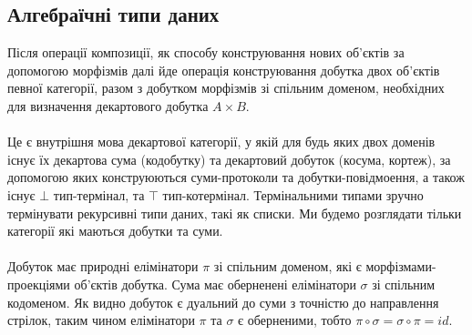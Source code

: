 \documentclass[11pt,oneside]{article}
\begin{document}
\newpage
\subsection{Алгебраїчні типи даних}

    Після операції композиції, як способу конструювання нових об’єктів
    за допомогою морфізмів далі йде операція конструювання добутка двох об’єктів певної категорії,
    разом з добутком морфізмів зі спільним доменом, необхідних для визначення декартового добутка $A \times B$.

    \paragraph{}
    Це є внутрішня мова декартової категорії, у якій для будь яких двох доменів існує їх декартова сума (кодобутку)
    та декартовий добуток (косума, кортеж), за допомогою яких конструюються суми-протоколи та добутки-повідмоення,
    а також існує $\bot$ тип-термінал, та $\top$ тип-котермінал. Термінальними типами зручно термінувати рекурсивні
    типи даних, такі як списки. Ми будемо розглядати тільки категорії які маються добутки та суми.

    \paragraph{}
    Добуток має природні елімінатори $\pi$ зі спільним доменом, які є морфізмами-проекціями об’єктів добутка. Сума має оберненені
    елімінатори $\sigma$ зі спільним кодоменом. Як видно добуток є дуальний до суми з точністю до направлення стрілок,
    таким чином елімінатори $\pi$ та $\sigma$ є оберненими, тобто $\pi \circ \sigma = \sigma \circ \pi = id$.
\end{document}
